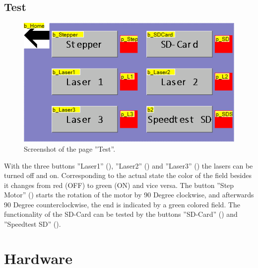 	\subsection{Test}
	
	\begin{figure}[h]
		\centering
		\includegraphics[width=0.7\linewidth]{LamellaDevice_Hardware/TestPage}
		\caption{Screenshot of the page ''Test''.}
		\label{fig:testpage}
	\end{figure}

	With the three buttons ''Laser1'' (), ''Laser2'' () and ''Laser3'' () the lasers can be turned off and on. Corresponding to the actual state the color of the field besides it changes from red (OFF) to green (ON) and vice versa.
	The button ''Step Motor'' () starts the rotation of the motor by 90 Degree clockwise, and afterwards 90 Degree counterclockwise, the end is indicated by a green colored field.
	The functionality of the SD-Card can be tested by the buttons ''SD-Card'' () and ''Speedtest SD'' (). 
	
	\section{Hardware}
	
